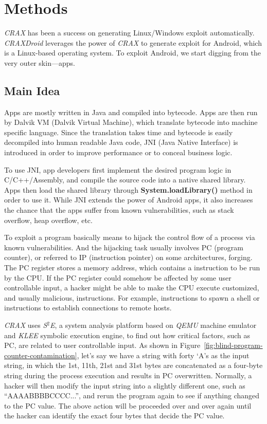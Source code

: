 \chapter{Methods}

\emph{CRAX}\autocite{huang2012crax} has been a success on generating
Linux/Windows exploit automatically. \emph{CRAXDroid} leverages the power of
\emph{CRAX} to generate exploit for Android, which is a Linux-based operating
system. To exploit Android, we start digging from the very outer skin---apps.

\section{Main Idea}

Apps are mostly written in Java and compiled into bytecode. Apps are then run
by Dalvik VM (Dalvik Virtual Machine), which translate bytecode into machine
specific language. Since the translation takes time and bytecode is easily
decompiled into human readable Java code, JNI (Java Native Interface) is
introduced in order to improve performance or to conceal business logic.

To use JNI, app developers first implement the desired program logic in
C/C++/Assembly, and compile the source code into a native shared library. Apps
then load the shared library through \textbf{System.loadLibrary()} method in
order to use it. While JNI extends the power of Android apps, it also increases
the chance that the apps suffer from known vulnerabilities, such as stack
overflow, heap overflow, etc.

To exploit a program basically means to hijack the control flow of a process
via known vulnerabilities. And the hijacking task usually involves PC (program
counter), or referred to IP (instruction pointer) on some architectures,
forging. The PC register stores a memory address, which contains a instruction
to be run by the CPU. If the PC register could somehow be affected by some user
controllable input, a hacker might be able to make the CPU execute customized,
and usually malicious, instructions. For example, instructions to spawn a
shell or instructions to establish connections to remote hosts.

\emph{CRAX} uses \emph{S$^{2}$E}\autocite{chipounov2011s2e}, a system analysis
platform based on \emph{QEMU} machine emulator and \emph{KLEE} symbolic
execution engine, to find out how critical factors, such as PC, are related to
user controllable input. As shown in
Figure~\ref{fig:blind-program-counter-contamination}, let's say we have a
string with forty `A's as the input string, in which the 1st, 11th, 21st and
31st bytes are concatenated as a four-byte string during the process execution
and results in PC overwritten. Normally, a hacker will then modify the input
string into a slightly different one, such as ``AAAABBBBCCCC...'', and rerun
the program again to see if anything changed to the PC value. The above action
will be proceeded over and over again until the hacker can identify the exact
four bytes that decide the PC value.

